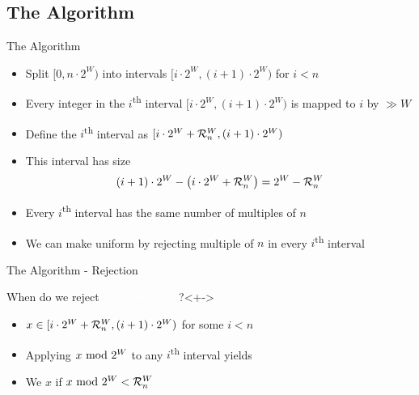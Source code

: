 \subsection{The Algorithm}\label{sec:3.2}
\begin{frame}{The Algorithm}
    \pause 
    \begin{itemize}[<+->]
        \item Split $[0,n \cdot 2^W)$ into intervals $[i \cdot 2^W, (i + 1) \cdot 2^W)$ for $i < n$ 
        \item Every integer in the $i$\textsuperscript{th} interval $[i \cdot 2^W, (i + 1) \cdot 2^W)$ is mapped to $i$ by $\gg W$
        \item Define the  $i$\textsuperscript{th} interval as $[i \cdot 2^W + \mathcal{R}_n^W, (i + 1) \cdot 2^W)$
        \item This interval has size \begin{align*}
            (i + 1) \cdot 2^W - \left(i \cdot 2^W + \mathcal{R}_n^W\right) = 2^W - \mathcal{R}_n^W
        \end{align*} 
        \item Every  $i$\textsuperscript{th} interval has the same number of multiples of $n$
        \item We can make  uniform by rejecting multiple of $n$ in every  $i$\textsuperscript{th} interval 
    \end{itemize}

\end{frame}

\begin{frame}{The Algorithm - Rejection}
    \pause 
    \begin{block}{When do we reject $\textcolor{white}{\boldmath{x \coloneqq \texttt{rand()} \cdot n}}$?}<+->
        \begin{itemize}[<+->]
            \item $x \in [i \cdot 2^W + \mathcal{R}_n^W, (i + 1) \cdot 2^W)$ for some $i < n$
            \item Applying $x \ \mathrm{mod}\ 2^W$ to any $i$\textsuperscript{th} interval yields 
            \item We  $x$ if $x \ \mathrm{mod}\ 2^W < \mathcal{R}_n^W$
        \end{itemize}
    \end{block}
\end{frame}

